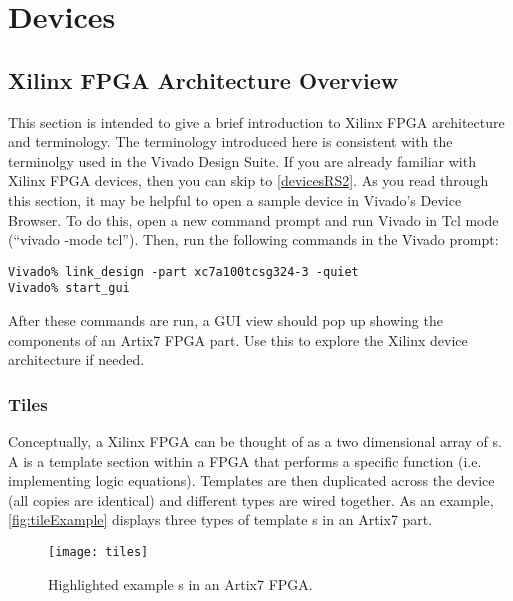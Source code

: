 \newpage
\section{Devices}

\subsection{Xilinx FPGA Architecture Overview} \label{fpgaArch}
This section is intended to give a brief introduction to Xilinx FPGA
architecture and terminology. The terminology introduced here is consistent
with the terminolgy used in the Vivado Design Suite. If you are already familiar
with Xilinx FPGA devices, then you can skip to \autoref{devicesRS2}. 
As you read through this section, it may be helpful to open a sample device in Vivado's
Device Browser. To do this, open a new command prompt and run Vivado in Tcl mode
(``vivado -mode tcl''). Then, run the following commands in the Vivado prompt:

\begin{verbatim}
Vivado% link_design -part xc7a100tcsg324-3 -quiet
Vivado% start_gui
\end{verbatim}

\noindent
After these commands are run, a GUI view should pop up showing the components
of an Artix7 FPGA part. Use this to explore the Xilinx device architecture if
needed.

\subsubsection{Tiles}
Conceptually, a Xilinx FPGA can be thought of as a two dimensional
array of s. A  is a template section within a FPGA that
performs a specific function (i.e. implementing logic equations). Templates are
then duplicated across the device (all copies are identical) and different
 types are wired together. As an example, \autoref{fig:tileExample}
displays three types of template s in an Artix7 part.

\begin{figure}[H]
 \centering
 \texttt{[image: tiles]}
 \caption{Highlighted example s in an Artix7 FPGA.}
 \label{fig:tileExample}
\end{figure}

